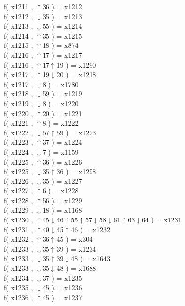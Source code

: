 f( x1211 , $\uparrow$36 ) = x1212 \\
f( x1212 , $\downarrow$35 ) = x1213 \\
f( x1213 , $\downarrow$55 ) = x1214 \\
f( x1214 , $\uparrow$35 ) = x1215 \\
f( x1215 , $\uparrow$18 ) = x874 \\
f( x1216 , $\uparrow$17 ) = x1217 \\
f( x1216 , $\uparrow$17$\uparrow$19 ) = x1290 \\
f( x1217 , $\uparrow$19$\downarrow$20 ) = x1218 \\
f( x1217 , $\downarrow$8 ) = x1780 \\
f( x1218 , $\downarrow$59 ) = x1219 \\
f( x1219 , $\downarrow$8 ) = x1220 \\
f( x1220 , $\uparrow$20 ) = x1221 \\
f( x1221 , $\uparrow$8 ) = x1222 \\
f( x1222 , $\downarrow$57$\uparrow$59 ) = x1223 \\
f( x1223 , $\uparrow$37 ) = x1224 \\
f( x1224 , $\downarrow$7 ) = x1159 \\
f( x1225 , $\uparrow$36 ) = x1226 \\
f( x1225 , $\downarrow$35$\uparrow$36 ) = x1298 \\
f( x1226 , $\downarrow$35 ) = x1227 \\
f( x1227 , $\uparrow$6 ) = x1228 \\
f( x1228 , $\uparrow$56 ) = x1229 \\
f( x1229 , $\downarrow$18 ) = x1168 \\
f( x1230 , $\uparrow$45$\downarrow$46$\uparrow$55$\uparrow$57$\downarrow$58$\downarrow$61$\uparrow$63$\downarrow$64 ) = x1231 \\
f( x1231 , $\uparrow$40$\downarrow$45$\uparrow$46 ) = x1232 \\
f( x1232 , $\uparrow$36$\uparrow$45 ) = x304 \\
f( x1233 , $\downarrow$35$\uparrow$39 ) = x1234 \\
f( x1233 , $\downarrow$35$\uparrow$39$\downarrow$48 ) = x1643 \\
f( x1233 , $\downarrow$35$\downarrow$48 ) = x1688 \\
f( x1234 , $\downarrow$37 ) = x1235 \\
f( x1235 , $\downarrow$45 ) = x1236 \\
f( x1236 , $\uparrow$45 ) = x1237 \\
